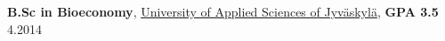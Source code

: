 \documentclass[a4paper,11pt]{article}
\renewcommand{\section}[1]{\pagebreak[3]%
    \vspace{0.8\baselineskip}%
    \phantomsection\addcontentsline{toc}{section}{#1}%
    \noindent\llap{\scshape\smash{\parbox[t]{\marginparwidth}{\hyphenpenalty=10000\raggedright #1}}}%
    \vspace{-\baselineskip}\par}
\newcommand{\halfblankline}{\quad\vspace{-0.5\baselineskip}\pagebreak[3]}
\begin{document}

\vspace{0.02cm}

 \textbf{B.Sc in Bioeconomy},
\href{https://jamk.fi/}{University of Applied Sciences of Jyväskylä}, \textbf{GPA 3.5}
\hfill {4.2014}



\end{document}
